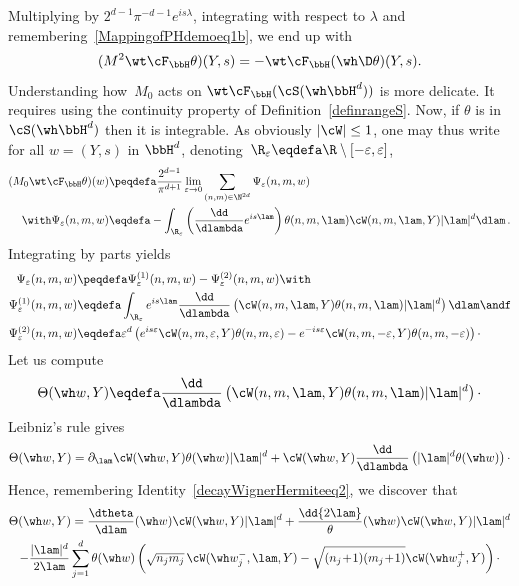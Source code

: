 Multiplying by $2^{d-1}\pi^{-d-1}e^{is\lambda}$, integrating with respect to $\lambda$ and remembering~\eqref{MappingofPHdemoeq1b}, we end up with
\begin{equation}\label{MappingofPHdemoeq3}
(M^2 \wt\cF_\bbH \theta)(Y,s) = - \wt\cF_\bbH (\wh\D\theta)(Y,s).
\end{equation}
Understanding how~$M_0$ acts on $\wt\cF_\bbH(\cS(\wh\bbH^d))$ is more delicate. It requires using the continuity property of Definition~\ref{definrangeS}. Now, if $\theta$ is in $\cS(\wh\bbH^d)$ then it is integrable. As obviously $|\cW|\leq 1$, one may thus write for all $w=(Y,s)$ in $\bbH^d$, denoting~$\R_\varepsilon\eqdefa \R\setminus[-\varepsilon,\varepsilon]$,
\[
\begin{aligned}
(M_0 \wt\cF_\bbH \theta)(w) & \peqdefa \frac {2^{d-1} } {\pi^{d+1} } \lim_{\varepsilon\rightarrow 0} \sum _{(n,m)\in \N^{2d}}
\Psi_\varepsilon(n,m,w) \\ \with
\Psi_\varepsilon(n,m,w) &\eqdefa - \int_{\R_\varepsilon}
\left(\frac{\dd}{\dlambda} e^{is\lam}\right) \theta (n,m,\lam)
\cW(n,m,\lam, Y) |\lam|^d \dlam\,.
\end{aligned}
\]
Integrating by parts yields
\[
\begin{aligned}
\Psi_\varepsilon(n,m,w) & \peqdefa \Psi^{(1)} _\varepsilon(n,m,w) - \Psi^{(2)} _\varepsilon(n,m,w) \with\\
\Psi^{(1)} _\varepsilon(n,m,w) & \eqdefa
\int_{\R_\varepsilon} e^{is\lam} \frac{\dd}{\dlambda} \left(\cW(n,m,\lam, Y)\theta (n,m,\lam) |\lam|^d\right) \dlam
\andf\\
\Psi^{(2)} _\varepsilon(n,m,w) & \eqdefa \varepsilon^d \left(e^{is\varepsilon} \cW (n,m,\varepsilon, Y)\theta (n,m,\varepsilon)- e^{-is\varepsilon} \cW (n,m,-\varepsilon, Y) \theta (n,m, -\varepsilon)\right)\cdotp
\end{aligned}
\]
Let us compute
\begin{equation}\label{MappingofPHdemoeq5}
\Theta(\wh w, Y)\eqdefa \frac{\dd}{\dlambda} \left(\cW(n,m,\lam,Y)\theta (n,m,\lam) |\lam|^d\right)\cdotp
\end{equation}
Leibniz's rule gives
\[
\Theta (\wh w, Y) = \partial_\lam \cW(\wh w,Y)\theta(\wh w) |\lam|^d+ \cW(\wh w, Y) \frac{\dd}{\dlambda} \left(|\lam|^d \theta (\wh w)\right)\cdotp
\]
Hence, remembering Identity~\eqref{decayWignerHermiteeq2}, we discover that
\begin{multline*}
\Theta(\wh w,Y) = \frac {\dtheta} {\dlam}(\wh w) \cW(\wh w,Y) |\lam|^d + \frac \dd {2\lam} \theta(\wh w) \cW (\wh w, Y) |\lam|^d\\
-\frac{|\lam|^d}{2\lam}\sum_{j=1} ^d \theta(\wh w) \left(\sqrt {n_jm_j}\, \cW(\wh w_j^-,\lam, Y) - \sqrt {(n_j\!+\!1)(m_j\!+\!1)} \cW (\wh w_j^+, Y)\right)\cdotp
\end{multline*}
